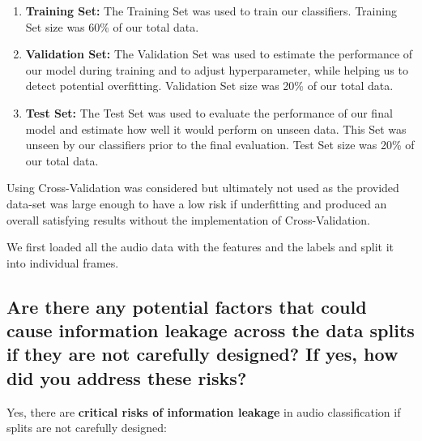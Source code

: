 \begin{enumerate}
	\item {\bf Training Set: } The Training Set was used to train our classifiers. Training Set size was 60\% of our total data.
	
	\item {\bf Validation Set: } The Validation Set was used to estimate the performance of our model during training and to adjust hyperparameter, while helping us to detect potential overfitting. Validation Set size was 20\% of our total data.

	\item {\bf Test Set: } The Test Set was used to evaluate the performance of our final model and estimate how well it would perform on unseen data. This Set was unseen by our classifiers prior to the final evaluation. Test Set size was 20\% of our total data.


    
\end{enumerate}

Using Cross-Validation was considered but ultimately not used as the provided data-set was large enough to have a low risk if underfitting and produced an overall satisfying results without the implementation of Cross-Validation.


We first loaded all the audio data with the features and the labels and split it into individual frames. 



\subsection{Are there any potential factors that could cause information leakage across the data splits if they are not carefully designed? If yes, how did you address these risks?}

Yes, there are {\bf critical risks of information leakage} in audio classification if splits are not carefully designed:


\label{sec:Data Split:b}

